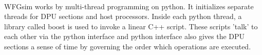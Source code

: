 \paragraph{}
WFGsim works by multi-thread programming on python. It initializes separate threads for DPU sections and host processors. Inside each python thread, a library called boost is used to invoke a linear C++ script. These scripts 'talk' to each other via the python interface and python interface also gives the DPU sections a sense of time by governing the order which operations are executed.